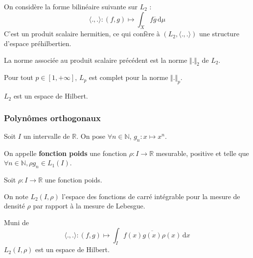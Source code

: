 	\begin{definition}
		On considère la forme bilinéaire suivante sur $L_2$ :
		\[ \langle ., . \rangle : (f, g) \mapsto \int_X f \overline{g} \, \mathrm{d}\mu \]
		C'est un produit scalaire hermitien, ce qui confère à $(L_2, \langle ., . \rangle)$ une structure d'espace préhilbertien.
	\end{definition}

	\begin{remark}
		La norme associée au produit scalaire précédent est la norme $\Vert . \Vert_2$ de $L_2$.
	\end{remark}


	\begin{theorem}
		Pour tout $p \in [1, +\infty]$, $L_p$ est complet pour la norme $\Vert . \Vert_p$.
	\end{theorem}


	\begin{corollary}
		$L_2$ est un espace de Hilbert.
	\end{corollary}

	\subsubsection{Polynômes orthogonaux}


	Soit $I$ un intervalle de $\mathbb{R}$. On pose $\forall n \in \mathbb{N}$, $g_n : x \mapsto x^n$.

	\begin{definition}
		On appelle \textbf{fonction poids} une fonction $\rho : I \rightarrow \mathbb{R}$ mesurable, positive et telle que $\forall n \in \mathbb{N}, \rho g_n \in L_1(I)$.
	\end{definition}

	Soit $\rho : I \rightarrow \mathbb{R}$ une fonction poids.

	\begin{notation}
		On note $L_2(I, \rho)$ l'espace des fonctions de carré intégrable pour la mesure de densité $\rho$ par rapport à la mesure de Lebesgue.
	\end{notation}

	\begin{proposition}
		Muni de
		\[ \langle ., . \rangle : (f,g) \mapsto \int_I f(x) \overline{g(x)} \rho(x) \, \mathrm{d}x \]
		$L_2(I, \rho)$ est un espace de Hilbert.
	\end{proposition}

